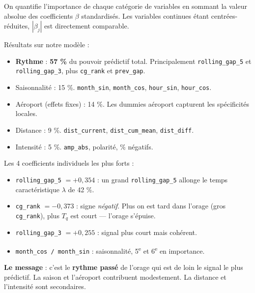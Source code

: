 \documentclass[11pt,a4paper]{article}
\begin{document}
\begin{dire}
\og On quantifie l'importance de chaque catégorie de variables en sommant la valeur absolue
des coefficients $\beta$ standardisés. Les variables continues étant centrées-réduites,
$|\beta_j|$ est directement comparable.

Résultats sur notre modèle :
\begin{itemize}[topsep=2pt]
    \item \textbf{Rythme} : \textbf{57 \%} du pouvoir prédictif total.
    Principalement \texttt{rolling\_gap\_5} et \texttt{rolling\_gap\_3}, plus
    \texttt{cg\_rank} et \texttt{prev\_gap}.
    \item Saisonnalité : 15 \%. \texttt{month\_sin}, \texttt{month\_cos}, \texttt{hour\_sin}, \texttt{hour\_cos}.
    \item Aéroport (effets fixes) : 14 \%. Les dummies aéroport capturent les spécificités locales.
    \item Distance : 9 \%. \texttt{dist\_current}, \texttt{dist\_cum\_mean}, \texttt{dist\_diff}.
    \item Intensité : 5 \%. \texttt{amp\_abs}, polarité, \% négatifs.
\end{itemize}

Les 4 coefficients individuels les plus forts :
\begin{itemize}[topsep=2pt]
    \item \texttt{rolling\_gap\_5} $= +0{,}354$ : un grand \texttt{rolling\_gap\_5}
    allonge le temps caractéristique $\lambda$ de 42 \%.
    \item \texttt{cg\_rank} $= -0{,}373$ : signe \emph{négatif}. Plus on est tard dans
    l'orage (gros \texttt{cg\_rank}), plus $T_q$ est court — l'orage s'épuise.
    \item \texttt{rolling\_gap\_3} $= +0{,}255$ : signal plus court mais cohérent.
    \item \texttt{month\_cos / month\_sin} : saisonnalité, 5\textsuperscript{e} et
    6\textsuperscript{e} en importance.
\end{itemize}

\textbf{Le message} : c'est le \textbf{rythme passé} de l'orage qui est de loin le signal
le plus prédictif. La saison et l'aéroport contribuent modestement. La distance et
l'intensité sont secondaires. \fg{}
\end{dire}
\end{document}
